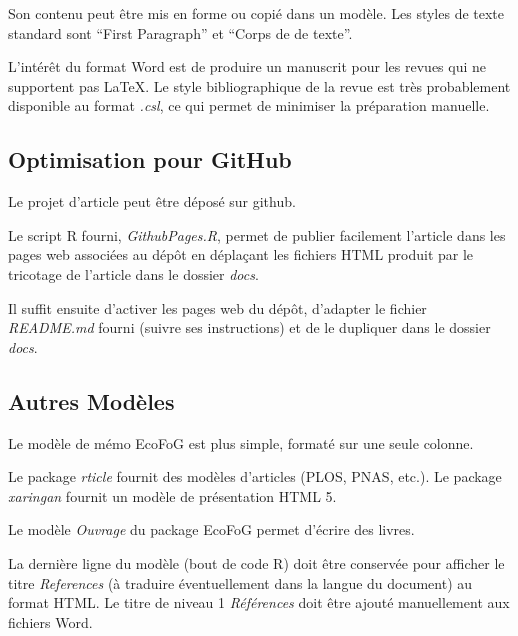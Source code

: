 \documentclass[fleqn,10pt]{ArtEcoFoG} %
\begin{document}
Son contenu peut être mis en forme ou copié dans un modèle.
Les styles de texte standard sont ``First Paragraph'' et ``Corps de de texte''.

L'intérêt du format Word est de produire un manuscrit pour les revues qui ne supportent pas LaTeX.
Le style bibliographique de la revue est très probablement disponible au format \emph{.csl}, ce qui permet de minimiser la préparation manuelle.

\hypertarget{optimisation-pour-github}{%
\subsection{Optimisation pour GitHub}\label{optimisation-pour-github}}

Le projet d'article peut être déposé sur github.

Le script R fourni, \emph{GithubPages.R}, permet de publier facilement l'article dans les pages web associées au dépôt en déplaçant les fichiers HTML produit par le tricotage de l'article dans le dossier \emph{docs}.

Il suffit ensuite d'activer les pages web du dépôt, d'adapter le fichier \emph{README.md} fourni (suivre ses instructions) et de le dupliquer dans le dossier \emph{docs}.

\hypertarget{autres-moduxe8les}{%
\subsection{Autres Modèles}\label{autres-moduxe8les}}

Le modèle de mémo EcoFoG est plus simple, formaté sur une seule colonne.

Le package \emph{rticle} fournit des modèles d'articles (PLOS, PNAS, etc.).
Le package \emph{xaringan} fournit un modèle de présentation HTML 5.

Le modèle \emph{Ouvrage} du package EcoFoG permet d'écrire des livres.

La dernière ligne du modèle (bout de code R) doit être conservée pour afficher le titre \emph{References} (à traduire éventuellement dans la langue du document) au format HTML.
Le titre de niveau 1 \emph{Références} doit être ajouté manuellement aux fichiers Word.



\makeatletter

\makeatother


\end{document}
